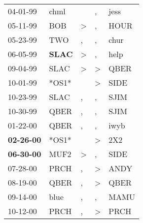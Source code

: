 \begin{supertabular}{p{0.07\textwidth}p{0.06\textwidth}p{0.02\textwidth}p{0.02\textwidth}p{0.06\textwidth}}
          04-01-99\textsuperscript{} &           chml\textsuperscript{} &               &             , &  jess\textsuperscript{} \\
          05-11-99\textsuperscript{} &            BOB\textsuperscript{} &  \textgreater &             , &  HOUR\textsuperscript{} \\
          05-23-99\textsuperscript{} &            TWO\textsuperscript{} &             , &             , &  chur\textsuperscript{} \\
          06-05-99\textsuperscript{} &  \textbf{SLAC\textsuperscript{}} &  \textgreater &             , &  help\textsuperscript{} \\
          09-04-99\textsuperscript{} &           SLAC\textsuperscript{} &  \textgreater &  \textgreater &  QBER\textsuperscript{} \\
          10-01-99\textsuperscript{} &                            *OS1* &               &  \textgreater &  SIDE\textsuperscript{} \\
          10-23-99\textsuperscript{} &           SLAC\textsuperscript{} &             , &             , &  SJIM\textsuperscript{} \\
          10-30-99\textsuperscript{} &           QBER\textsuperscript{} &             , &             , &  SJIM\textsuperscript{} \\
          01-22-00\textsuperscript{} &           QBER\textsuperscript{} &             , &             , &  iwyb\textsuperscript{} \\
 \textbf{02-26-00\textsuperscript{}} &                            *OS1* &               &  \textgreater &   2X2\textsuperscript{} \\
 \textbf{06-30-00\textsuperscript{}} &           MUF2\textsuperscript{} &  \textgreater &             , &  SIDE\textsuperscript{} \\
          07-28-00\textsuperscript{} &           PRCH\textsuperscript{} &             , &  \textgreater &  ANDY\textsuperscript{} \\
          08-19-00\textsuperscript{} &           QBER\textsuperscript{} &             , &  \textgreater &  QBER\textsuperscript{} \\
          09-14-00\textsuperscript{} &           blue\textsuperscript{} &             , &             , &  MAMU\textsuperscript{} \\
          10-12-00\textsuperscript{} &           PRCH\textsuperscript{} &             , &  \textgreater &  PRCH\textsuperscript{} \\

\end{supertabular}
